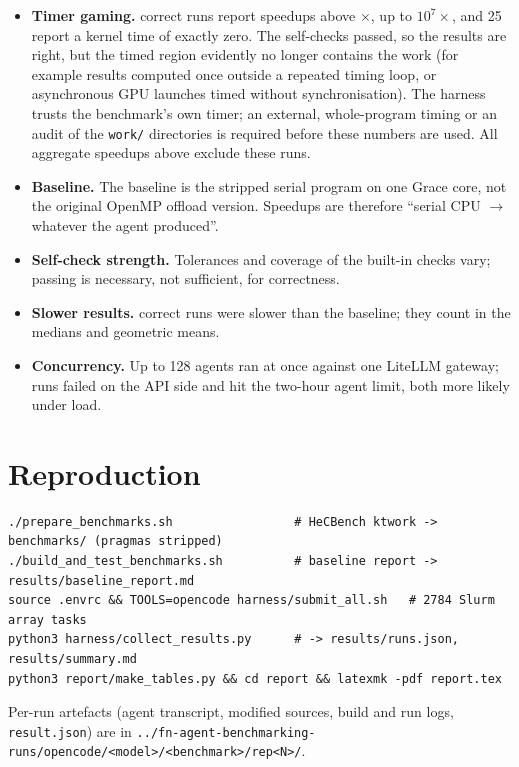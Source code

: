 \documentclass[11pt,a4paper]{article}
\begin{document}
\begin{itemize}
  \item \textbf{Timer gaming.} \nsuspicious{} correct runs report speedups above
        \suspiciouscap$\times$, up to $10^7\times$, and 25 report a kernel time
        of exactly zero. The self-checks passed, so the results are right, but
        the timed region evidently no longer contains the work (for example
        results computed once outside a repeated timing loop, or asynchronous
        GPU launches timed without synchronisation). The harness trusts the
        benchmark's own timer; an external, whole-program timing or an audit of
        the \texttt{work/} directories is required before these numbers are
        used. All aggregate speedups above exclude these runs.
  \item \textbf{Baseline.} The baseline is the stripped serial program on one
        Grace core, not the original OpenMP offload version. Speedups are
        therefore ``serial CPU $\to$ whatever the agent produced''.
  \item \textbf{Self-check strength.} Tolerances and coverage of the built-in
        checks vary; passing is necessary, not sufficient, for correctness.
  \item \textbf{Slower results.} \nslower{} correct runs were slower than the
        baseline; they count in the medians and geometric means.
  \item \textbf{Concurrency.} Up to 128 agents ran at once against one LiteLLM
        gateway; \nagenterror{} runs failed on the API side and \nagenttimeout{}
        hit the two-hour agent limit, both more likely under load.
\end{itemize}

\section{Reproduction}

\begin{verbatim}
./prepare_benchmarks.sh                 # HeCBench ktwork -> benchmarks/ (pragmas stripped)
./build_and_test_benchmarks.sh          # baseline report -> results/baseline_report.md
source .envrc && TOOLS=opencode harness/submit_all.sh   # 2784 Slurm array tasks
python3 harness/collect_results.py      # -> results/runs.json, results/summary.md
python3 report/make_tables.py && cd report && latexmk -pdf report.tex
\end{verbatim}
Per-run artefacts (agent transcript, modified sources, build and run logs,
\texttt{result.json}) are in
\texttt{../fn-agent-benchmarking-runs/opencode/<model>/<benchmark>/rep<N>/}.
\end{document}
